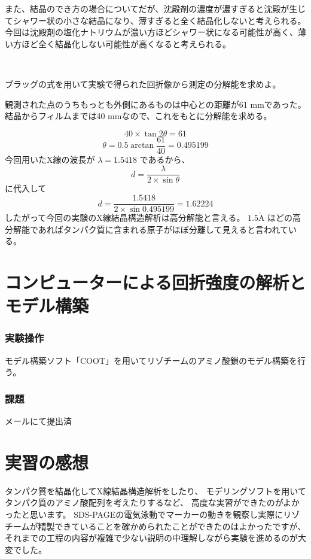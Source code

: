 \documentclass[a4paper,papersize,dvipdfmx]{jsarticle}
\begin{document}
また、結晶のでき方の場合についてだが、沈殿剤の濃度が濃すぎると沈殿が生じてシャワー状の小さな結晶になり、薄すぎると全く結晶化しないと考えられる。今回は沈殿剤の塩化ナトリウムが濃い方ほどシャワー状になる可能性が高く、薄い方ほど全く結晶化しない可能性が高くなると考えられる。

\

\begin{tcolorbox}[colback=white,colbacktitle=black,coltitle=white,title={2}]
ブラッグの式を用いて実験で得られた回折像から測定の分解能を求めよ。
\end{tcolorbox}

観測された点のうちもっとも外側にあるものは中心との距離が61 mmであった。結晶からフィルムまでは40 mmなので、これをもとに分解能を求める。

\[ 40 \times \tan 2\theta = 61 \]
\[ \theta = 0.5 \arctan \frac{61}{40} = 0.495199\]
今回用いたX線の波長が $\lambda = 1.5418$ であるから、
\[d= \frac{\lambda}{2 \times \sin \theta}\]
に代入して
\[d= \frac{1.5418}{2 \times \sin 0.495199} = 1.62224\]
したがって今回の実験のX線結晶構造解析は高分解能と言える。
$1.5\mathrm{\mathring{A}}$ 
ほどの高分解能であればタンパク質に含まれる原子がほぼ分離して見えると言われている。

\part*{コンピューターによる回折強度の解析とモデル構築}

\section*{実験操作}
モデル構築ソフト「COOT」を用いてリゾチームのアミノ酸鎖のモデル構築を行う。

\section*{課題}
メールにて提出済


\part*{実習の感想}
タンパク質を結晶化してX線結晶構造解析をしたり、
モデリングソフトを用いてタンパク質のアミノ酸配列を考えたりするなど、
高度な実習ができたのがよかったと思います。
SDS-PAGEの電気泳動でマーカーの動きを観察し実際にリゾチームが精製できていることを確かめられたことができたのはよかったですが、それまでの工程の内容が複雑で少ない説明の中理解しながら実験を進めるのが大変でした。
\end{document}
